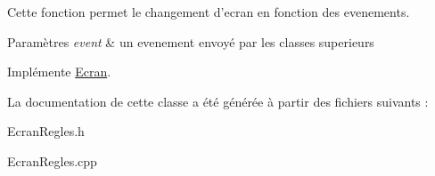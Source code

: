 \-Cette fonction permet le changement d'ecran en fonction des evenements. 


\begin{DoxyParams}{\-Paramètres}
{\em event} & un evenement envoyé par les classes superieurs \\
\hline
\end{DoxyParams}


\-Implémente \hyperlink{classEcran}{\-Ecran}.



\-La documentation de cette classe a été générée à partir des fichiers suivants \-:\begin{DoxyCompactItemize}
\item 
\-Ecran\-Regles.\-h\item 
\-Ecran\-Regles.\-cpp\end{DoxyCompactItemize}
